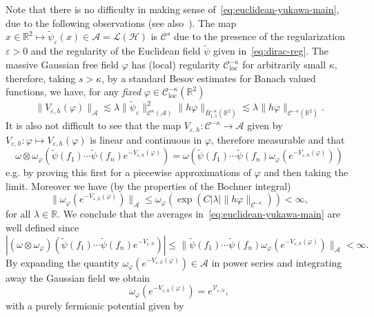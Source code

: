 \documentclass{article}
\newcommand{\tmop}[1]{\ensuremath{\operatorname{#1}}}
\newcommand{\tmtextit}[1]{{\itshape{#1}}}
\begin{document}
Note that there is no difficulty in making sense
of~{\eqref{eq:euclidean-yukawa-main}}, due to the following observations (see
also~{\cite{osterwalder_euclidean_1973-2}}). The map $x \in \mathbb{R}^2
\mapsto \tilde{\psi}_{\varepsilon} (x) \in \mathcal{A}= \mathcal{L}
(\mathcal{H})$ is $\mathcal{C}^s$ due to the presence of the regularization
$\varepsilon > 0$ and the regularity of the Euclidean field $\tilde{\psi}$
given in~{\eqref{eq:dirac-reg}}. The massive Gaussian free field $\varphi$ has
(local) regularity $\mathcal{C}^{- \kappa}_{\tmop{loc}}$ for arbitrarily small
$\kappa$, therefore, taking $s > \kappa$, by a standard Besov estimates for
Banach valued functions, we have, for any \tmtextit{fixed} $\varphi \in
\mathcal{C}^{- \kappa}_{\tmop{loc}} (\mathbb{R}^2)$
\[ \| V_{\varepsilon, h} (\varphi) \|_{\mathcal{A}} \lesssim \lambda \|
   \tilde{\psi}_{\varepsilon} \|^2_{\mathcal{C}^{\kappa} (\mathcal{A})} \| h
   \varphi \|_{B^{- \kappa}_{1, 1} (\mathbb{R}^2)} \lesssim \lambda \| h
   \varphi \|_{\mathcal{C}^{- \kappa} (\mathbb{R}^2)} . \]
It is also not difficult to see that the map $V_{\varepsilon, h} :
\mathcal{C}^{- \kappa} \rightarrow \mathcal{A}$ given by $V_{\varepsilon, h} :
\varphi \mapsto V_{\varepsilon, h} (\varphi)$ is linear and continuous in
$\varphi$, therefore measurable and that
\[ \omega \otimes \omega_{\varphi} (\tilde{\psi} (f_1) \cdots \tilde{\psi}
   (f_n) e^{- V_{\varepsilon, h} (\varphi)}) = \omega (\tilde{\psi} (f_1)
   \cdots \tilde{\psi} (f_n) \omega_{\varphi} (e^{- V_{\varepsilon, h}
   (\varphi)})) \]
e.g. by proving this first for a piecewise approximations of $\varphi$ and
then taking the limit. Moreover we have (by the properties of the Bochner
integral)
\[ \| \omega_{\varphi} (e^{- V_{\varepsilon, h} (\varphi)}) \|_{\mathcal{A}}
   \leqslant \omega_{\varphi} (\exp (C | \lambda | \| h \varphi
   \|_{\mathcal{C}^{- \kappa}})) < \infty, \]
for all $\lambda \in \mathbb{R}$. We conclude that the averages
in~{\eqref{eq:euclidean-yukawa-main}} are well defined since
\[ | (\omega \otimes \omega_{\varphi}) (\tilde{\psi} (f_1) \cdots
   \tilde{\psi} (f_n) e^{- V_{\varepsilon, h}}) | \leqslant \| \tilde{\psi}
   (f_1) \cdots \tilde{\psi} (f_n) \omega_{\varphi} (e^{- V_{\varepsilon, h}
   (\varphi)}) \|_{\mathcal{A}} < \infty . \]
By expanding the quantity $\omega_{\varphi} (e^{- V_{\varepsilon, h}
(\varphi)}) \in \mathcal{A}$ in power series and integrating away the Gaussian
field we obtain
\[ \omega_{\varphi} (e^{- V_{\varepsilon, h} (\varphi)}) =
   e^{\mathcal{V}_{\varepsilon, h}}, \]
with a purely fermionic potential given by
\end{document}
